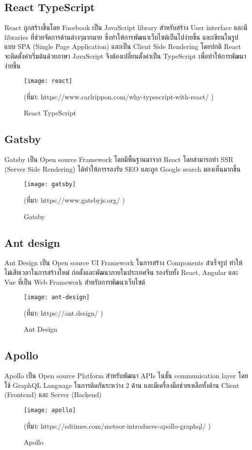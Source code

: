 \subsection{React TypeScript}
React ถูกสร้างขึ้นโดย Facebook เป็น JavaScript library สำหรับสร้าง User interface และมี libraries ที่ช่วยจัดการด้านต่างๆมากมาย ซึ่งทำให้การพัฒนาเว็บไซต์เป็นไปง่ายขึ้น
และเขียนในรูปแบบ SPA (Single Page Application) และเป็น Client Side Rendering
โดยปกติ React จะติดตั้งค่าเริ่มต้นด้วยภาษา JavaScript จึงต้องเปลี่ยนตั้งค่าเป็น TypeScript เพื่อทำให้การพัฒนาง่ายขึ้น
\begin{figure}[!h]
	\centering
	\texttt{[image: react]}
	\caption{React TypeScript}
	(ที่มา: 
	https://www.carlrippon.com/why-typescript-with-react/
	)
	\label{Fig:react}
\end{figure}
\newpage
\subsection{Gatsby}
Gatsby เป็น Open source Framework โดยมีพื้นฐานมาจาก React โดยสามารถทำ SSR (Server Side Rendering)
ได้ทำให้การรองรับ SEO และถูก Google search มองเห็นมากขึ้น

\begin{figure}[!h]
	\centering
	\texttt{[image: gatsby]}
	\caption{Gatsby}
	(ที่มา: 
	https://www.gatsbyjs.org/
	)
	\label{Fig:gatsby}
\end{figure}

\subsection{Ant design}
Ant Design เป็น Open source UI Framework ในการสร้าง Components สำเร็จรูป ทำให้ไม่เสียเวลาในการสร้างใหม่
ก่อตั้งและพัฒนาภายในประเทศจีน รองรับทั้ง React, Angular และ Vue ที่เป็น Web Framework สำหรับการพัฒนาเว็บไซต์
\begin{figure}[!h]
	\centering
	\texttt{[image: ant-design]}
	\caption{Ant Design}
	(ที่มา: 
	https://ant.design/
	)
	\label{Fig:ant-design}
\end{figure}
\subsection{Apollo}
Apollo เป็น Open source Platform สำหรับพัฒนา APIs ในชั้น communication layer 
โดยใช้ GraphQL Language ในการติดกันระหว่าง 2 ด้าน และมีเครื่องมือช่วยเหลือทั้งด้าน Client (Frontend) และ Server (Backend)

\begin{figure}[!h]
	\centering
	\texttt{[image: apollo]}
	\caption{Apollo}
	(ที่มา: 
	https://sdtimes.com/meteor-introduces-apollo-graphql/
	)
	\label{Fig:apollo}
\end{figure}

